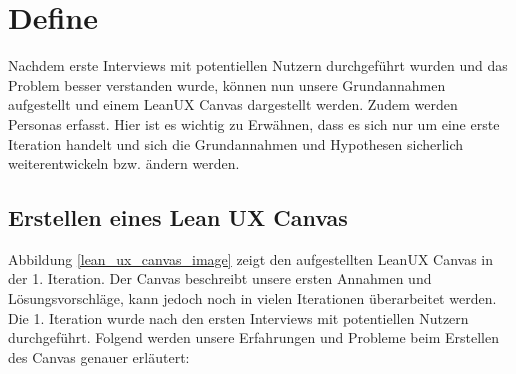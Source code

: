 \section{Define}
Nachdem erste Interviews mit potentiellen Nutzern durchgeführt wurden und das Problem besser verstanden wurde, können nun unsere Grundannahmen aufgestellt und einem LeanUX Canvas dargestellt werden. Zudem werden Personas erfasst. Hier ist es wichtig zu Erwähnen, dass es sich nur um eine erste Iteration handelt und sich die Grundannahmen und Hypothesen sicherlich weiterentwickeln bzw. ändern werden.

\subsection{Erstellen eines Lean UX Canvas} \label{lean_ux_canvas}
Abbildung \ref{lean_ux_canvas_image} zeigt den aufgestellten LeanUX Canvas in der 1. Iteration. Der Canvas beschreibt unsere ersten Annahmen und Lösungsvorschläge, kann jedoch noch in vielen Iterationen überarbeitet werden. Die 1. Iteration wurde nach den ersten Interviews mit potentiellen Nutzern durchgeführt.
Folgend werden unsere Erfahrungen und Probleme beim Erstellen des Canvas genauer erläutert:

